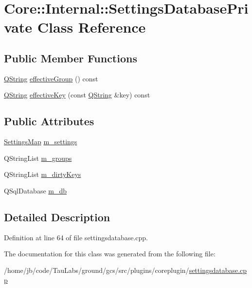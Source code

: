 \hypertarget{class_core_1_1_internal_1_1_settings_database_private}{\section{\-Core\-:\-:\-Internal\-:\-:\-Settings\-Database\-Private \-Class \-Reference}
\label{class_core_1_1_internal_1_1_settings_database_private}
}
\subsection*{\-Public \-Member \-Functions}
\begin{DoxyCompactItemize}
\item 
\hyperlink{group___u_a_v_objects_plugin_gab9d252f49c333c94a72f97ce3105a32d}{\-Q\-String} \hyperlink{group___core_plugin_gae3c0ac37ac92027db10ed8e4217f60db}{effective\-Group} () const 
\item 
\hyperlink{group___u_a_v_objects_plugin_gab9d252f49c333c94a72f97ce3105a32d}{\-Q\-String} \hyperlink{group___core_plugin_gaa39731470013be66184cff522fd02a62}{effective\-Key} (const \hyperlink{group___u_a_v_objects_plugin_gab9d252f49c333c94a72f97ce3105a32d}{\-Q\-String} \&key) const 
\end{DoxyCompactItemize}
\subsection*{\-Public \-Attributes}
\begin{DoxyCompactItemize}
\item 
\hyperlink{group___core_plugin_ga82251e6825f9c8021ae18f52f510c3fa}{\-Settings\-Map} \hyperlink{group___core_plugin_ga2e1146040679e3c513138629c976013c}{m\-\_\-settings}
\item 
\-Q\-String\-List \hyperlink{group___core_plugin_ga11cf6b95abf91ec2970fdffe567cab68}{m\-\_\-groups}
\item 
\-Q\-String\-List \hyperlink{group___core_plugin_gaf906b80bb9481d156e6d4f69bc0e52b3}{m\-\_\-dirty\-Keys}
\item 
\-Q\-Sql\-Database \hyperlink{group___core_plugin_gae73eea4c76a3fc8182d9b75d0e1c0438}{m\-\_\-db}
\end{DoxyCompactItemize}


\subsection{\-Detailed \-Description}


\-Definition at line 64 of file settingsdatabase.\-cpp.



\-The documentation for this class was generated from the following file\-:\begin{DoxyCompactItemize}
\item 
/home/jb/code/\-Tau\-Labs/ground/gcs/src/plugins/coreplugin/\hyperlink{settingsdatabase_8cpp}{settingsdatabase.\-cpp}\end{DoxyCompactItemize}
